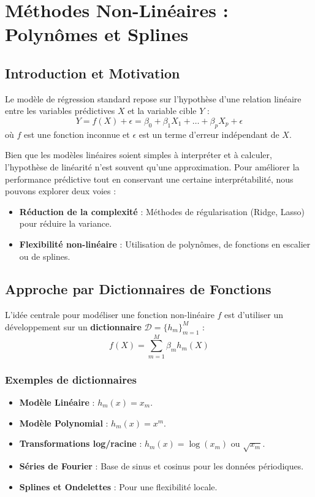 \chapter{Méthodes Non-Linéaires : Polynômes et Splines}
\section{Introduction et Motivation}

Le modèle de régression standard repose sur l'hypothèse d'une relation linéaire entre les variables prédictives $X$ et la variable cible $Y$ :
\begin{equation}
    Y = f(X) + \epsilon = \beta_0 + \beta_1 X_1 + \dots + \beta_p X_p + \epsilon 
\end{equation}
où $f$ est une fonction inconnue et $\epsilon$ est un terme d'erreur indépendant de $X$. 

Bien que les modèles linéaires soient simples à interpréter et à calculer, l'hypothèse de linéarité n'est souvent qu'une approximation. Pour améliorer la performance prédictive tout en conservant une certaine interprétabilité, nous pouvons explorer deux voies :
\begin{itemize}
    \item \textbf{Réduction de la complexité} : Méthodes de régularisation (Ridge, Lasso) pour réduire la variance.
    \item \textbf{Flexibilité non-linéaire} : Utilisation de polynômes, de fonctions en escalier ou de splines.
\end{itemize}

\section{Approche par Dictionnaires de Fonctions}

L'idée centrale pour modéliser une fonction non-linéaire $f$ est d'utiliser un développement sur un \textbf{dictionnaire} $\mathcal{D} = \{h_m\}_{m=1}^M$ :
\begin{equation}
    f(X) = \sum_{m=1}^{M} \beta_m h_m(X) 
\end{equation}

\subsection{Exemples de dictionnaires }
\begin{itemize}
    \item \textbf{Modèle Linéaire} : $h_m(x) = x_m$.
    \item \textbf{Modèle Polynomial} : $h_m(x) = x^m$.
    \item \textbf{Transformations log/racine} : $h_m(x) = \log(x_m)$ ou $\sqrt{x_m}$.
    \item \textbf{Séries de Fourier} : Base de sinus et cosinus pour les données périodiques.
    \item \textbf{Splines et Ondelettes} : Pour une flexibilité locale.
\end{itemize}

